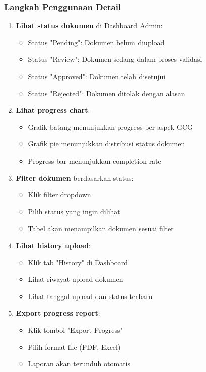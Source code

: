 \documentclass[12pt,a4paper]{article}
\begin{document}
\subsubsection{Langkah Penggunaan Detail}
\begin{enumerate}
\item \textbf{Lihat status dokumen} di Dashboard Admin:
\begin{itemize}
\item Status "Pending": Dokumen belum diupload
\item Status "Review": Dokumen sedang dalam proses validasi
\item Status "Approved": Dokumen telah disetujui
\item Status "Rejected": Dokumen ditolak dengan alasan
\end{itemize}
\item \textbf{Lihat progress chart}:
\begin{itemize}
\item Grafik batang menunjukkan progress per aspek GCG
\item Grafik pie menunjukkan distribusi status dokumen
\item Progress bar menunjukkan completion rate
\end{itemize}
\item \textbf{Filter dokumen} berdasarkan status:
\begin{itemize}
\item Klik filter dropdown
\item Pilih status yang ingin dilihat
\item Tabel akan menampilkan dokumen sesuai filter
\end{itemize}
\item \textbf{Lihat history upload}:
\begin{itemize}
\item Klik tab "History" di Dashboard
\item Lihat riwayat upload dokumen
\item Lihat tanggal upload dan status terbaru
\end{itemize}
\item \textbf{Export progress report}:
\begin{itemize}
\item Klik tombol "Export Progress"
\item Pilih format file (PDF, Excel)
\item Laporan akan terunduh otomatis
\end{itemize}
\end{enumerate}
\end{document}
